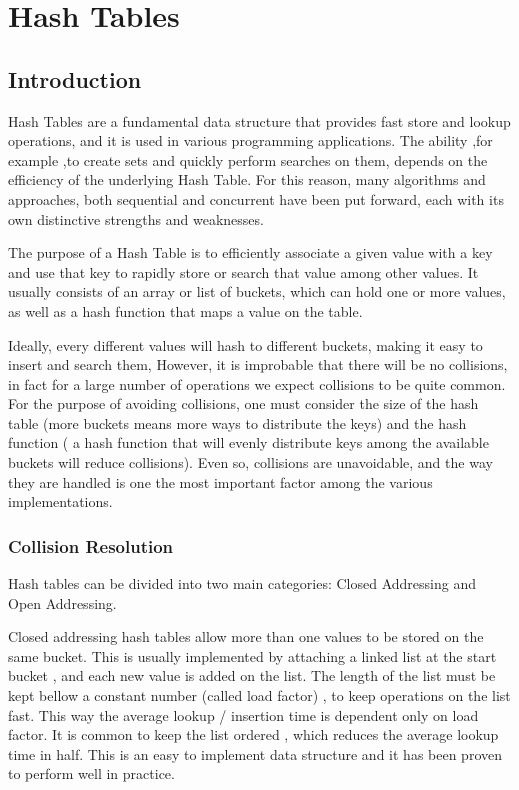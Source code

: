 
\def\<#1>{\textit{#1}}

\chapter{Hash Tables}
\section{Introduction}

Hash Tables are a fundamental data structure that provides fast store and lookup operations, and it is used in various programming applications. The ability ,for example ,to create sets and quickly perform searches on them, depends on the efficiency of the underlying Hash Table. For this reason, many algorithms and approaches, both sequential and concurrent have been put forward, each with its own distinctive strengths and weaknesses. 

The purpose of a Hash Table is to efficiently associate a given value with a key and use that key to rapidly store or search that value among other values. It usually consists of an array or list of buckets, which can hold one or more values, as well as a hash function that maps a value on the table.

Ideally,  every different values will hash to different buckets, making it easy to insert and search them, However, it is improbable that there will be no collisions, in fact for a large number of operations we expect collisions to be quite common. For the purpose of avoiding collisions, one must consider the size of the hash table (more buckets  means more ways to distribute the keys) and the hash function ( a hash function that will evenly distribute keys among the available buckets will reduce collisions). Even so, collisions are unavoidable, and the way they are handled is one the most important factor among the various implementations.

\subsection{Collision Resolution}

Hash tables can be divided into two main categories: Closed Addressing and Open Addressing.


Closed addressing hash tables allow more than one values to be stored on the same bucket. This is usually implemented by attaching a linked list at the start bucket , and each new value is added on the list. The length of the list  must be kept bellow a constant number (called load factor) , to keep operations on the list fast. This way the average lookup / insertion time is dependent only on load factor. It is common to keep the list ordered , which reduces the average lookup time in half. This is an easy to implement data structure and it has been proven to perform well in practice.

